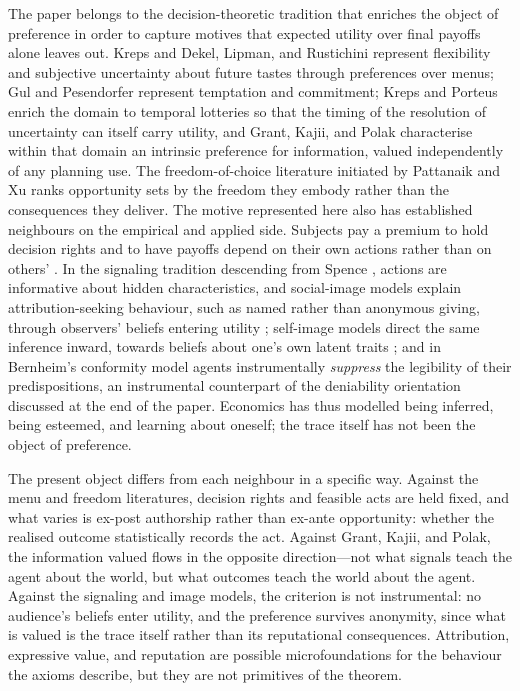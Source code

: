 \documentclass[11pt,a4paper]{article}
\theoremstyle{definition}
\newcommand{\1}{\mathbf 1}
\begin{document}
The paper belongs to the decision-theoretic tradition that enriches the object of preference in order to capture motives
that expected utility over final payoffs alone leaves out.  Kreps \cite{Kreps1979} and Dekel, Lipman, and Rustichini
\cite{DekelLipmanRustichini2001} represent flexibility and subjective uncertainty about future tastes through
preferences over menus; Gul and Pesendorfer \cite{GulPesendorfer2001} represent temptation and commitment; Kreps and
Porteus \cite{KrepsPorteus1978} enrich the domain to temporal lotteries so that the timing of the resolution of
uncertainty can itself carry utility, and Grant, Kajii, and Polak \cite{GrantKajiiPolak1998} characterise within that
domain an intrinsic preference for information, valued independently of any planning use.  The freedom-of-choice
literature initiated by Pattanaik and Xu \cite{PattanaikXu1990} ranks opportunity sets by the freedom they embody rather
than the consequences they deliver.  The motive represented here also has established neighbours on the empirical and
applied side.  Subjects pay a premium to hold decision rights and to have payoffs depend on their own actions rather
than on others' \cite{BartlingFehrHerz2014,FehrHerzWilkening2013,OwensGrossmanFackler2014}.  In the signaling tradition
descending from Spence \cite{Spence1973}, actions are informative about hidden characteristics, and social-image models
explain attribution-seeking behaviour, such as named rather than anonymous giving, through observers' beliefs entering
utility \cite{GlazerKonrad1996,BenabouTirole2006,AndreoniBernheim2009}; self-image models direct the same inference
inward, towards beliefs about one's own latent traits \cite{BenabouTirole2002}; and in Bernheim's conformity model
\cite{Bernheim1994} agents instrumentally \emph{suppress} the legibility of their predispositions, an instrumental
counterpart of the deniability orientation discussed at the end of the paper.  Economics has thus modelled being
inferred, being esteemed, and learning about oneself; the trace itself has not been the object of preference.

The present object differs from each neighbour in a specific way.  Against the menu and freedom literatures, decision
rights and feasible acts are held fixed, and what varies is ex-post authorship rather than ex-ante opportunity: whether
the realised outcome statistically records the act.  Against Grant, Kajii, and Polak, the information valued flows in
the opposite direction---not what signals teach the agent about the world, but what outcomes teach the world about the
agent.  Against the signaling and image models, the criterion is not instrumental: no audience's beliefs enter utility,
and the preference survives anonymity, since what is valued is the trace itself rather than its reputational
consequences.  Attribution, expressive value, and reputation are possible microfoundations for the behaviour the axioms
describe, but they are not primitives of the theorem.
\end{document}
